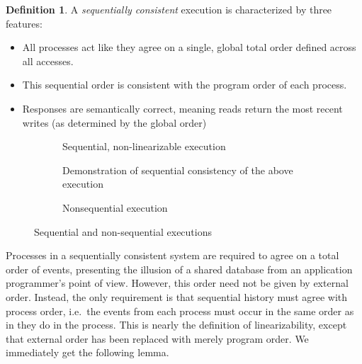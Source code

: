 \documentclass[]             %
{NASA}                       %
\theoremstyle{definition}
\newtheorem{definition}{Definition}[section]
\begin{document}
\begin{definition}
  \label{def:sequentiallyconsistent}
  A \emph{sequentially consistent} execution is
  characterized by three features:
  \begin{itemize}
  \item All processes act like they agree on a single, global total order
    defined across all accesses.
  \item This sequential order is consistent with the program order of each process.
  \item Responses are semantically correct, meaning reads return the most recent writes (as determined by the global order)
  \end{itemize}
\end{definition}

\begin{figure}[p]
  \setlength\belowcaptionskip{5ex}

  \begin{subfigure}{1\textwidth}
    \centering
    
    \caption{Sequential, non-linearizable execution}
    \label{fig:linearEx13}
  \end{subfigure}

  \begin{subfigure}{1\textwidth}
    
    \caption{Demonstration of sequential consistency of the above execution}
    \label{fig:linearEx14}
  \end{subfigure}

  \begin{subfigure}{1\textwidth}
    
    \caption{Nonsequential execution}
    \label{fig:linearEx12}
  \end{subfigure}

  \caption{Sequential and non-sequential executions}
  \label{fig:linearEx}
\end{figure}

\afterpage{\clearpage}

Processes in a sequentially consistent system are required to agree on a
total order of events, presenting the illusion of a shared database from
an application programmer's point of view. However, this order need not
be given by external order. Instead, the only requirement is that
sequential history must agree with process order, i.e.~the events from
each process must occur in the same order as in they do in the process.
This is nearly the definition of linearizability, except that external
order has been replaced with merely program order. We immediately get
the following lemma.
\end{document}
